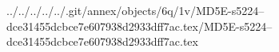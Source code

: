 ../../../../../.git/annex/objects/6q/1v/MD5E-s5224--dce31455dcbce7e607938d2933dff7ac.tex/MD5E-s5224--dce31455dcbce7e607938d2933dff7ac.tex